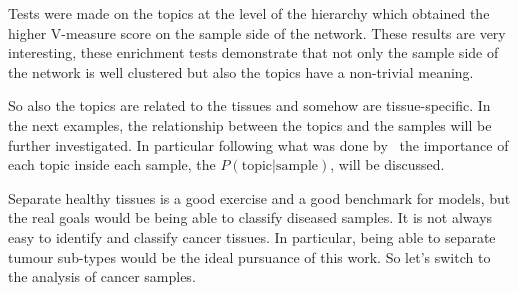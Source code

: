 Tests were made on the topics at the level of the hierarchy which obtained the higher V-measure score on the sample side of the network. These results are very interesting, these enrichment tests demonstrate that not only the sample side of the network is well clustered but also the topics have a non-trivial meaning.

So also the topics are related to the tissues and somehow are tissue-specific. In the next examples, the relationship between the topics and the samples will be further investigated. In particular following what was done by~\cite{dey2017visualizing} the importance of each topic inside each sample, the $P(\text{topic} | \text{sample})$, will be discussed.

\FloatBarrier
Separate healthy tissues is a good exercise and a good benchmark for models, but the real goals would be being able to classify diseased samples. It is not always easy to identify and classify cancer tissues. In particular, being able to separate tumour sub-types would be the ideal pursuance of this work. So let's switch to the analysis of cancer samples.
